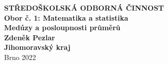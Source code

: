 \documentclass[12pt]{report}
\begin{document}
\newcommand{\ZZ}{{\mathbb{Z}}}
\newcommand{\cyc}[1]{{\langle #1 \rangle}}


\newtheorem{veta}{Věta}[section]


\theoremstyle{de}
\newtheorem{de}{Definition}[section]
\newtheorem{dusledek}[veta]{Důsledek}
\newtheorem{lemma}[veta]{Lemma}
\newtheorem*{lemma*}{Lemma}


\theoremstyle{definition}
\newtheorem{priklad}[veta]{Příklad}
\newtheorem{definice}[veta]{Definice}
\newtheorem{problem}[veta]{Problém}
\newtheorem{znaceni}[veta]{Značení}
\newtheorem*{umluva}{Úmluva}
\newtheorem*{poznamka}{Poznámka}
\newtheorem{dfn}[veta]{Definition}


\setlength{\parindent}{2ex}

\def\Tr{\operatorname{Tr}}
\def\N{\operatorname{N}}
\def\SL{\operatorname{SL}}
\def\nsd{\operatorname{nsd}}
\def\End{\operatorname{End}}
\def\id{\operatorname{id}}
\def\char{\operatorname{char}}
\def\ker{\operatorname{ker}}
\def\Aut{\operatorname{Aut}}
\def\Gal{\operatorname{Gal}}
\def\Fix{\operatorname{Fix}}
\def\c{\operatorname{\mathbb{C}}}
\def\R{\operatorname{\mathbb{R}}}
\def\q{\operatorname{\mathbb{Q}}}
\def\e{\operatorname{\mathcal{V}}}
\def\z{\operatorname{\mathbb{Z}}}
\def\n{\operatorname{\mathbb{N}}}
\def\s{\operatorname{\subseteq}}
\def\w{\operatorname{\zeta}}
\def\fii{\operatorname{\varphi}}
\def\o{\operatorname{\mathcal{O}}}
\def\I{\operatorname{\mathcal{I}}}
\def\J{\operatorname{\mathcal{J}}}
\def\P{\operatorname{\mathcal{P}}}
\def\pn{\operatorname{\mathfrak{P}}}
\def\pn{\operatorname{\mathfrak{p}}}
\def\res{\operatorname{res}}
\def\ord{\operatorname{ord}}
\def\AG{\operatorname{AG}}
\setlength{\emergencystretch}{3em}


\begin{titlepage}
{
\centering
\LARGE \textbf{STŘEDOŠKOLSKÁ ODBORNÁ ČINNOST}\\
\Large\textbf{Obor č. 1: Matematika a statistika}\\
\vspace{6cm}
\LARGE\textbf{Medúzy a posloupnosti průměrů}\\
}
\vspace{10cm}
{\noindent\large\bfseries Zdeněk Pezlar\\ 
	\large\bfseries Jihomoravský kraj\\ }
\center\large Brno 2022
	
\end{titlepage}
\end{document}
